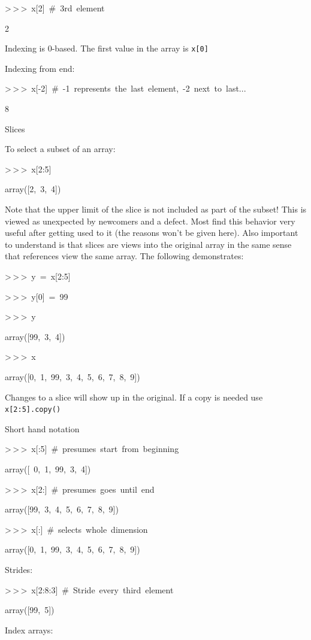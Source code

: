 \begin{lyxcode}
>\,{}>\,{}>~x{[}2]~\#~3rd~element

2
\end{lyxcode}
Indexing is 0-based. The first value in the array is \texttt{x{[}0]}

Indexing from end:

\begin{lyxcode}
>\,{}>\,{}>~x{[}-2]~\#~-1~represents~the~last~element,~-2~next~to~last...

8
\end{lyxcode}
Slices

To select a subset of an array:

\begin{lyxcode}
>\,{}>\,{}>~x{[}2:5]

array({[}2,~3,~4])
\end{lyxcode}
Note that the upper limit of the slice is not included as part of
the subset! This is viewed as unexpected by newcomers and a defect.
Most find this behavior very useful after getting used to it (the
reasons won't be given here). Also important to understand is that
slices are views into the original array in the same sense that references
view the same array. The following demonstrates:

\begin{lyxcode}
>\,{}>\,{}>~y~=~x{[}2:5]

>\,{}>\,{}>~y{[}0]~=~99

>\,{}>\,{}>~y

array({[}99,~3,~4])

>\,{}>\,{}>~x

array({[}0,~1,~99,~3,~4,~5,~6,~7,~8,~9])
\end{lyxcode}
Changes to a slice will show up in the original. If a copy is needed
use \texttt{x{[}2:5].copy()}

Short hand notation

\begin{lyxcode}
>\,{}>\,{}>~x{[}:5]~\#~presumes~start~from~beginning

array({[}~0,~1,~99,~3,~4])

>\,{}>\,{}>~x{[}2:]~\#~presumes~goes~until~end

array({[}99,~3,~4,~5,~6,~7,~8,~9])

>\,{}>\,{}>~x{[}:]~\#~selects~whole~dimension

array({[}0,~1,~99,~3,~4,~5,~6,~7,~8,~9])
\end{lyxcode}
Strides:

\begin{lyxcode}
>\,{}>\,{}>~x{[}2:8:3]~\#~Stride~every~third~element

array({[}99,~5])
\end{lyxcode}
Index arrays:

